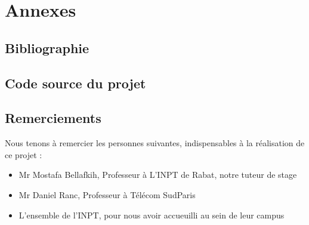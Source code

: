 \documentclass[a4paper,10pt]{report}
\begin{document}
  \chapter{Annexes}
    \section{Bibliographie}
    \section{Code source du projet}

    \section{Remerciements}
    {Nous tenons à remercier les personnes suivantes, indispensables à la réalisation de ce projet :}
    \begin{itemize}
      \item Mr Mostafa Bellafkih, Professeur à L'INPT de Rabat, notre tuteur de stage
      \item Mr Daniel Ranc, Professeur à Télécom SudParis
      \item L'ensemble de l'INPT, pour nous avoir accueuilli au sein de leur campus
    \end{itemize}
\end{document}
